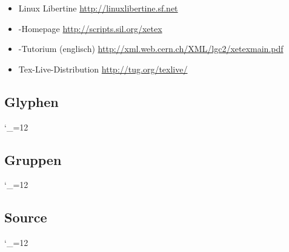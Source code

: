 \documentclass{fontdoku}
\begin{document}
\begin{itemize}
   \item Linux Libertine \hfill\url{http://linuxlibertine.sf.net}
   \item \XeTeX-Homepage \hfill\url{http://scripts.sil.org/xetex}
   \item \XeTeX-Tutorium (englisch) \hfill\url{http://xml.web.cern.ch/XML/lgc2/xetexmain.pdf}
   \item Tex-Live-Distribution \hfill\url{http://tug.org/texlive/}
\end{itemize}

\newpage
\subsection{Glyphen}

{%
\setlength{\columnseprule}{.5pt}
\setlength{\columnsep}{1cm}
\begin{multicols}{3}
   \newcommand{\GYLPHNAME}[1]{\sindex[glyph]{#1}%
   \makebox[3cm][l]{\hypertarget{glyph.#1}{}\hyperlink{gglyph.#1}{#1}}\hfill%
   {\Huge\fbox{\libertineGlyph{#1}\strut}}\hfill\mbox{}\newline}
   \catcode`\_=12%
\end{multicols}
}


\newpage
\subsection{Gruppen}
{\setlength{\columnseprule}{.5pt}
\setlength{\columnsep}{1cm}
\catcode`\_=12%
\newcommand{\GROUPHEAD}[1]{\begin{multicols}{3}[\subsubsection{#1}]}
\newcommand{\GROUPFOOT}{\end{multicols}}
\newcommand{\GROUPGLYPH}[2]{\sindex[glyph]{#2}%
   \makebox[3cm][l]{\hyperlink{glyph.#2}{#2}\hypertarget{gglyph.#2}{}{\small(0x#1)}}%
   \hfill{\Huge\libertineGlyph{#2}\strut}\hfill\mbox{}\newline}
}

\newpage
\subsection{Source}



\newpage
{}
%
{\catcode`\_=12%
\def\indexcolumn{4}%
\printindex[glyph]
}
\printindex[idx]
\end{document}

